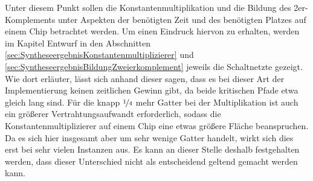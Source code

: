 Unter diesem Punkt sollen die Konstantenmultiplikation und die Bildung des 2er-Komplements unter Aspekten der benötigten Zeit und des benötigten Platzes auf einem Chip 
betrachtet werden. Um einen Eindruck hiervon zu erhalten, werden im Kapitel Entwurf in den Abschnitten \ref{sec:SyntheseergebnisKonstantenmultiplizierer} und
\ref{sec:SyntheseergebnisBildungZweierkomplement} jeweils die Schaltnetzte 
gezeigt.
Wie dort erläuter, lässt sich anhand dieser sagen, dass es bei dieser Art der Implementierung keinen zeitlichen Gewinn gibt, da beide kritischen Pfade etwa gleich lang 
sind. Für die knapp $\nicefrac{1}{4}$ mehr Gatter bei der Multiplikation ist auch ein größerer Vertrahtungsaufwandt erforderlich, sodass die Konstantenmultiplizierer
auf einem Chip eine etwas größere Fläche beanspruchen. Da es sich hier insgesamt aber um sehr wenige Gatter handelt, wirkt sich dies erst bei sehr vielen Instanzen aus.
Es kann an dieser Stelle deshalb festgehalten werden, dass dieser Unterschied nicht als entscheidend geltend gemacht werden kann.
